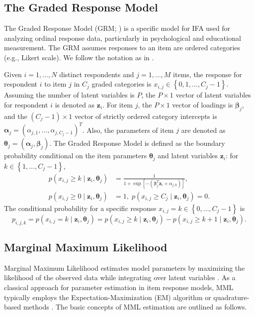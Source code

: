 \documentclass[a4paper,12pt]{article}
\theoremstyle{plain} %
\theoremstyle{remark} %
\theoremstyle{definition} %
\begin{document}
\subsection{The Graded Response Model}
The Graded Response Model (GRM; \citealp{samejima1969estimation}) is a specific model for IFA used for analyzing ordinal response data, particularly in psychological and educational measurement. The GRM assumes responses to an item are ordered categories (e.g., Likert scale). We follow the notation as in \citet{cai2010high}.

Given $i=1,\dots,N$ distinct respondents and $j=1,\dots,M$ items, the response for respondent $i$ to item $j$ in $C_j$ graded categories is $x_{i,j}\in\left\{0,1,\dots,C_j-1\right\}$. Assuming the number of latent variables is $P$, the $P \times 1$ vector of latent variables for respondent $i$ is denoted as $\bm{z}_i$. For item $j$, the $P \times 1$ vector of loadings is $\bm{\beta}_j$, and the $(C_j-1)\times1$ vector of strictly ordered category intercepts is $\bm{\alpha}_j=(\alpha_{j,1},\dots,\alpha_{j,C_j-1})^T$. Also, the parameters of item $j$ are denoted as $\bm{\theta}_j=(\bm{\alpha}_j,\bm{\beta}_j)$. The Graded Response Model is defined as the boundary probability conditional on the item parameters $\bm{\theta}_j$ and latent variables $\bm{z}_i$: for $k\in\left\{1,\dots,C_j-1\right\}$,
\begin{equation}\label{eq:grm}
    \begin{aligned}
        p(x_{i,j}\geq k \mid \bm{z}_i,\bm{\theta}_j)&=\frac{1}{1+\exp\left[-(\bm{\beta}_j^T\bm{z}_i+\alpha_{j,k})\right]},\\
         p(x_{i,j}\geq 0 \mid \bm{z}_i,\bm{\theta}_j)&=1,\;
         p(x_{i,j}\geq C_j \mid \bm{z}_i,\bm{\theta}_j)=0.
    \end{aligned}
\end{equation}
The conditional probability for a specific response $x_{i,j}=k\in\left\{0,\dots,C_j-1\right\}$ is
\begin{equation}\label{eq:grm_prob}
    p_{i,j,k} = p(x_{i,j}= k \mid \bm{z}_i,\bm{\theta}_j)=p(x_{i,j}\geq k \mid \bm{z}_i,\bm{\theta}_j)-p(x_{i,j}\geq k+1 \mid \bm{z}_i,\bm{\theta}_j).
\end{equation}

\subsection{Marginal Maximum Likelihood}
Marginal Maximum Likelihood estimates model parameters by maximizing the likelihood of the observed data while integrating over latent variables
. As a classical approach for parameter estimation in item response models, MML typically employs the Expectation-Maximization (EM) algorithm \citep[e.g.,][]{dempster1977maximum,bock1981marginal, muraki1992generalized, rizopoulos2007ltm, johnson2007marginal} or quadrature-based methods \citep[e.g.,][]{darrell1970fitting,rabe2005maximum}. The basic concepts of MML estimation are outlined as follows.
\end{document}
